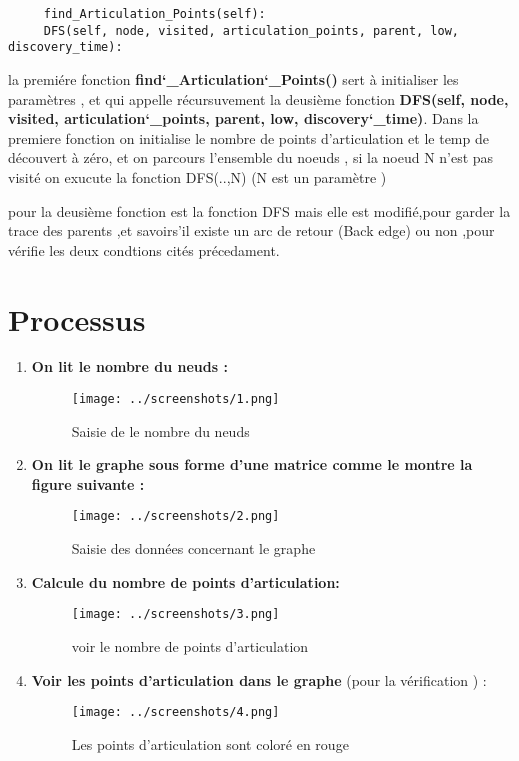 \documentclass[12pt]{report}
\begin{document}
\lstset{language=Python}
\lstset{frame=lines}
\lstset{basicstyle=\footnotesize}
\begin{lstlisting}
     find_Articulation_Points(self):
     DFS(self, node, visited, articulation_points, parent, low, discovery_time):
\end{lstlisting}
    \par{}          
          la premiére fonction \textbf{find\char`_Articulation\char`_Points()} sert à initialiser les paramètres , et qui appelle récursuvement la deusième fonction \textbf{DFS(self, node, visited, articulation\char`_points, parent, low, discovery\char`_time)}.
          \newline
          Dans la premiere fonction on initialise le nombre de points d'articulation et le temp de découvert à zéro, et on parcours l'ensemble du noeuds , si la noeud N n'est pas visité on exucute la fonction DFS(..,N) (N est un paramètre )
    \par{}
          pour la deusième fonction est la fonction DFS mais elle est modifié,pour garder la trace des parents ,et savoirs'il existe un arc de retour (Back edge) ou non ,pour vérifie les deux condtions cités précedament.  
      \newpage     
	\section{Processus}
	\begin{enumerate}
		\item \textbf{On lit le nombre du neuds :}
		\begin{figure}[h!]
	\centering
\texttt{[image: ../screenshots/1.png]}
	\caption{Saisie de le nombre du neuds}	
	\end{figure}
\FloatBarrier
		\item \textbf{On lit le graphe  sous forme d'une matrice comme le montre la figure suivante :}
			\begin{figure}[h!]
	\centering
\texttt{[image: ../screenshots/2.png]}
	\caption{Saisie des données concernant le graphe}
	\end{figure}
	\FloatBarrier
	\item \textbf{Calcule du nombre de points d'articulation:}
	\begin{figure}[h!]
		\centering
		\texttt{[image: ../screenshots/3.png]}
		\caption{voir le nombre de points d'articulation }
	\end{figure}
	\FloatBarrier
	\item \textbf{Voir les points d'articulation dans le graphe} (pour la vérification ) :
	\begin{figure}[h!]
		\centering
		\texttt{[image: ../screenshots/4.png]}
		\caption{Les points d'articulation sont coloré en rouge}
	\end{figure}
	\FloatBarrier
\end{enumerate}	
	
\end{document}
